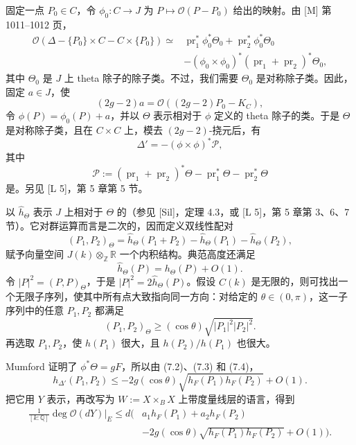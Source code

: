 固定一点 $P_0\in C$，令 $\phi_0:C\to J$ 为 $P\mapsto\mathcal O(P-P_0)$ 给出的映射。由 [M] 第 1011--1012 页，
\begin{align*}
\mathcal O(\Delta-\{P_0\}\times C-C\times\{P_0\})
\simeq{}&\operatorname{pr}_1^*\phi_0^*\Theta_0
+\operatorname{pr}_2^*\phi_0^*\Theta_0\\
&-(\phi_0\times\phi_0)^*(\operatorname{pr}_1+\operatorname{pr}_2)^*\Theta_0,
\end{align*}
其中 $\Theta_0$ 是 $J$ 上 theta 除子的除子类。不过，我们需要 $\Theta_0$ 是对称除子类。因此，固定 $a\in J$，使
\[
(2g-2)a=\mathcal O((2g-2)P_0-K_C),
\]
令 $\phi(P)=\phi_0(P)+a$，并以 $\Theta$ 表示相对于 $\phi$ 定义的 theta 除子的类。于是 $\Theta$ 是对称除子类，且在 $C\times C$ 上，模去 $(2g-2)$-挠元后，有
\begin{equation*}
\Delta'=-(\phi\times\phi)^*\mathscr P,\tag{7.2}
\end{equation*}
其中
\[
\mathscr P:=(\operatorname{pr}_1+\operatorname{pr}_2)^*\Theta
-\operatorname{pr}_1^*\Theta-\operatorname{pr}_2^*\Theta
\]
是。另见 [L 5]，第 5 章第 5 节。

以 $\widehat h_\Theta$ 表示 $J$ 上相对于 $\Theta$ 的（参见 [Sil]，定理 4.3，或 [L 5]，第 5 章第 3、6、7 节）。它对群运算而言是二次的，因而定义双线性配对
\[
(P_1,P_2)_\Theta=\widehat h_\Theta(P_1+P_2)
-\widehat h_\Theta(P_1)-\widehat h_\Theta(P_2),
\]
赋予向量空间 $J(k)\otimes_{\mathbb Z}\mathbb R$ 一个内积结构。典范高度还满足
\begin{equation*}
\widehat h_\Theta(P)=h_\Theta(P)+O(1).\tag{7.3}
\end{equation*}
令 $|P|^2=(P,P)_\Theta$，于是 $|P|^2=2\widehat h_\Theta(P)$。假设 $C(k)$ 是无限的，则可找出一个无限子序列，使其中所有点大致指向同一方向：对给定的 $\theta\in(0,\pi)$，这一子序列中的任意 $P_1,P_2$ 都满足
\begin{equation*}
(P_1,P_2)_\Theta\ge(\cos\theta)\sqrt{|P_1|^2|P_2|^2}.\tag{7.4}
\end{equation*}
再选取 $P_1,P_2$，使 $h(P_1)$ 很大，且 $h(P_2)/h(P_1)$ 也很大。

Mumford 证明了 $\phi^*\Theta=gF$，所以由 (7.2)、(7.3) 和 (7.4)，
\[
h_{\Delta'}(P_1,P_2)
\le-2g(\cos\theta)\sqrt{h_F(P_1)h_F(P_2)}+O(1).
\]
把它用 $Y$ 表示，再改写为 $W:=X\times_BX$ 上带度量线层的语言，得到
\begin{align*}
\frac1{[k:\mathbb Q]}\deg\mathcal O(dY)|_E
\le d\bigl(&a_1h_F(P_1)+a_2h_F(P_2)\\
&-2g(\cos\theta)\sqrt{h_F(P_1)h_F(P_2)}+O(1)\bigr).
\end{align*}

